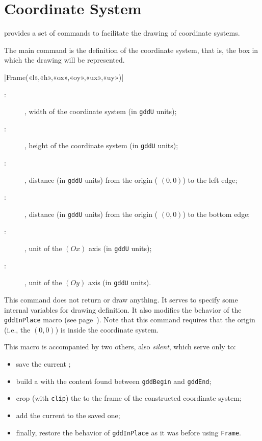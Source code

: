 \documentclass[a4paper,english]{article}
\begin{document}
\section{Coordinate System}

\mpgeomdd provides a set of commands to facilitate the drawing of coordinate systems.

The main command is the definition of the coordinate system, that is, the box in which the drawing will be represented.
\begin{colourband}
  \macro|Frame(«l»,«h»,«ox»,«oy»,«ux»,«uy»)|
  \begin{description}
    \item[:] , width of the coordinate system (in \lstinline+gddU+ units);
    \item[:] , height of the coordinate system (in \lstinline+gddU+ units);
    \item[:] , distance (in \lstinline+gddU+ units) from the origin ( $(0,0)$) to the left edge;
    \item[:] , distance (in \lstinline+gddU+ units) from the origin ( $(0,0)$) to the bottom edge;
    \item[:] , unit of the $(Ox)$ axis (in \lstinline+gddU+ units);
    \item[:] , unit of the $(Oy)$ axis (in \lstinline+gddU+ units).
  \end{description}
\end{colourband}


This command does not return or draw anything. It serves to specify some internal variables for drawing definition. It also modifies the behavior of the \lstinline+gddInPlace+ macro (see page~\pageref{gddEnPlace}). Note that this command requires that the origin (i.e., the  $(0,0)$) is inside the coordinate system.

This macro is accompanied by two others, also \emph{silent}, which serve only to:
\begin{itemize}
\item save the current ;
\item build a  with the content found between \lstinline+gddBegin+ and \lstinline+gddEnd+;
\item crop (with \lstinline+clip+) the  to the frame of the constructed coordinate system;
\item add the current  to the saved one;
\item finally, restore the behavior of \lstinline+gddInPlace+ as it was before using \lstinline+Frame+.
\end{itemize}
\end{document}
